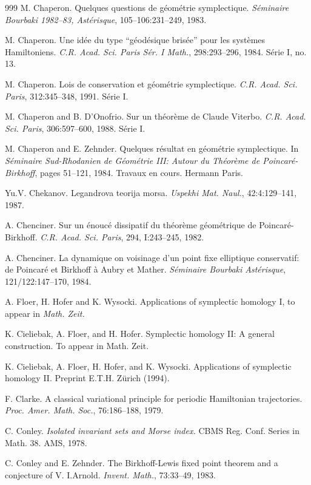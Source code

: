 \begin{thebibliography}{999}
 M. Chaperon. Quelques questions de géométrie symplectique.
\emph{Séminaire Bourbaki 1982--83, Astérisque}, 105--106:231--249, 1983.

 M. Chaperon. Une idée du type ``géodésique brisée'' pour
les systèmes Hamiltoniens. \emph{C.R. Acad. Sci. Paris Sér. I Math.},
298:293--296, 1984. Série I, no. 13.

 M. Chaperon. Lois de conservation et géométrie symplectique.
\emph{C.R. Acad. Sci. Paris}, 312:345--348, 1991. Série I.

 M. Chaperon and B. D'Onofrio. Sur un théorème de Claude
Viterbo. \emph{C.R. Acad. Sci. Paris}, 306:597--600, 1988. Série I.

 M. Chaperon and E. Zehnder. Quelques résultat en géométrie
symplectique. In \emph{Séminaire Sud-Rhodanien de Géométrie III: Autour
du Théorème de Poincaré-Birkhoff}, pages 51--121, 1984.
Travaux en cours. Hermann Paris.

 Yu.V. Chekanov. Legandrova teorija morsa.
\emph{Uspekhi Mat. Naul.}, 42:4:129--141, 1987.

 A. Chenciner. Sur un énoucé dissipatif du théorème
géométrique de Poincaré-Birkhoff. \emph{C.R. Acad. Sci. Paris},
294, I:243--245, 1982.

 A. Chenciner. La dynamique on voisinage d'un point fixe
elliptique conservatif: de Poincaré et Birkhoff à Aubry et Mather.
\emph{Séminaire Bourbaki Astérisque}, 121/122:147--170, 1984.

 A. Floer, H. Hofer and K. Wysocki. Applications of symplectic
homology I, to appear in \emph{Math. Zeit.}

 K. Cieliebak, A. Floer, and H. Hofer. Symplectic homology II:
A general construction. To appear in Math. Zeit.

 K. Cieliebak, A. Floer, H. Hofer, and K. Wysocki.
Applications of symplectic homology II. Preprint E.T.H. Zürich (1994).

 F. Clarke. A classical variational principle for periodic
Hamiltonian trajectories. \emph{Proc. Amer. Math. Soc.}, 76:186--188, 1979.

 C. Conley. \emph{Isolated invariant sets and Morse index.}
CBMS Reg. Conf. Series in Math. 38. AMS, 1978.

 C. Conley and E. Zehnder. The Birkhoff-Lewis fixed point
theorem and a conjecture of V. I.Arnold. \emph{Invent. Math.},
73:33--49, 1983.


\end{thebibliography}
